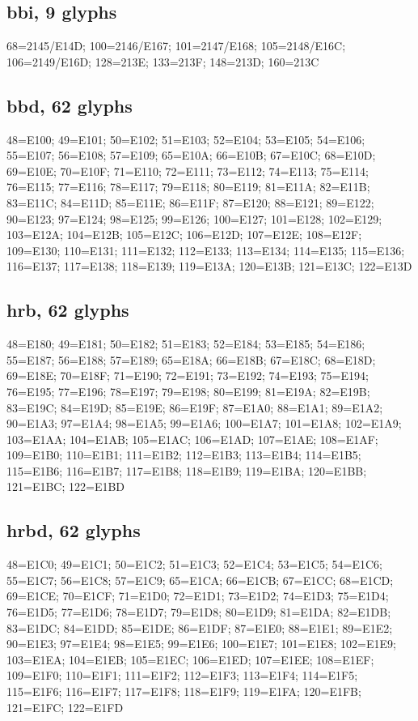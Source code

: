 \subsection*{bbi, 9 glyphs}
\raggedright\small 68=2145/E14D; 100=2146/E167; 101=2147/E168; 105=2148/E16C;
106=2149/E16D; 128=213E; 133=213F; 148=213D; 160=213C\par

\subsection*{bbd, 62 glyphs}
\raggedright\small 48=E100; 49=E101; 50=E102; 51=E103; 52=E104; 53=E105;
54=E106; 55=E107; 56=E108; 57=E109; 65=E10A; 66=E10B; 67=E10C; 68=E10D;
69=E10E; 70=E10F; 71=E110; 72=E111; 73=E112; 74=E113; 75=E114; 76=E115;
77=E116; 78=E117; 79=E118; 80=E119; 81=E11A; 82=E11B; 83=E11C; 84=E11D;
85=E11E; 86=E11F; 87=E120; 88=E121; 89=E122; 90=E123; 97=E124; 98=E125;
99=E126; 100=E127; 101=E128; 102=E129; 103=E12A; 104=E12B; 105=E12C; 106=E12D;
107=E12E; 108=E12F; 109=E130; 110=E131; 111=E132; 112=E133; 113=E134; 114=E135;
115=E136; 116=E137; 117=E138; 118=E139; 119=E13A; 120=E13B; 121=E13C;
122=E13D\par

\subsection*{hrb, 62 glyphs}
\raggedright\small 48=E180; 49=E181; 50=E182; 51=E183; 52=E184; 53=E185;
54=E186; 55=E187; 56=E188; 57=E189; 65=E18A; 66=E18B; 67=E18C; 68=E18D;
69=E18E; 70=E18F; 71=E190; 72=E191; 73=E192; 74=E193; 75=E194; 76=E195;
77=E196; 78=E197; 79=E198; 80=E199; 81=E19A; 82=E19B; 83=E19C; 84=E19D;
85=E19E; 86=E19F; 87=E1A0; 88=E1A1; 89=E1A2; 90=E1A3; 97=E1A4; 98=E1A5;
99=E1A6; 100=E1A7; 101=E1A8; 102=E1A9; 103=E1AA; 104=E1AB; 105=E1AC; 106=E1AD;
107=E1AE; 108=E1AF; 109=E1B0; 110=E1B1; 111=E1B2; 112=E1B3; 113=E1B4; 114=E1B5;
115=E1B6; 116=E1B7; 117=E1B8; 118=E1B9; 119=E1BA; 120=E1BB; 121=E1BC;
122=E1BD\par

\subsection*{hrbd, 62 glyphs}
\raggedright\small 48=E1C0; 49=E1C1; 50=E1C2; 51=E1C3; 52=E1C4; 53=E1C5;
54=E1C6; 55=E1C7; 56=E1C8; 57=E1C9; 65=E1CA; 66=E1CB; 67=E1CC; 68=E1CD;
69=E1CE; 70=E1CF; 71=E1D0; 72=E1D1; 73=E1D2; 74=E1D3; 75=E1D4; 76=E1D5;
77=E1D6; 78=E1D7; 79=E1D8; 80=E1D9; 81=E1DA; 82=E1DB; 83=E1DC; 84=E1DD;
85=E1DE; 86=E1DF; 87=E1E0; 88=E1E1; 89=E1E2; 90=E1E3; 97=E1E4; 98=E1E5;
99=E1E6; 100=E1E7; 101=E1E8; 102=E1E9; 103=E1EA; 104=E1EB; 105=E1EC; 106=E1ED;
107=E1EE; 108=E1EF; 109=E1F0; 110=E1F1; 111=E1F2; 112=E1F3; 113=E1F4; 114=E1F5;
115=E1F6; 116=E1F7; 117=E1F8; 118=E1F9; 119=E1FA; 120=E1FB; 121=E1FC;
122=E1FD\par

